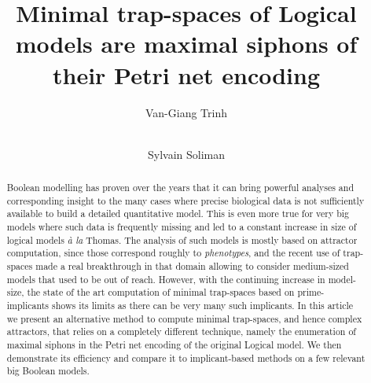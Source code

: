 \documentclass[runningheads]{llncs}
\begin{document}
%
\title{Minimal trap-spaces of Logical models are maximal siphons of their Petri net encoding}
\author{Van-Giang Trinh \and \\
  Sylvain Soliman}


\maketitle

\begin{abstract}

  Boolean modelling has proven over the years that it can bring powerful analyses and corresponding insight to the many cases where precise biological data is not sufficiently available to build a detailed quantitative model.
  This is even more true for very big models where such data is frequently missing and led to a constant increase in size of logical models \emph{à la} Thomas.
  The analysis of such models is mostly based on attractor computation, since those correspond roughly to \emph{phenotypes}, and the recent use of trap-spaces made a real breakthrough in that domain allowing to consider medium-sized models that used to be out of reach.
  However, with the continuing increase in model-size, the state of the art computation of minimal trap-spaces based on prime-implicants shows its limits as there can be very many such implicants.
  In this article we present an alternative method to compute minimal trap-spaces, and hence complex attractors, that relies on a completely different technique, namely the enumeration of maximal siphons in the Petri net encoding of the original Logical model.
  We then demonstrate its efficiency and compare it to implicant-based methods on a few relevant big Boolean models.

\end{abstract}
\end{document}
